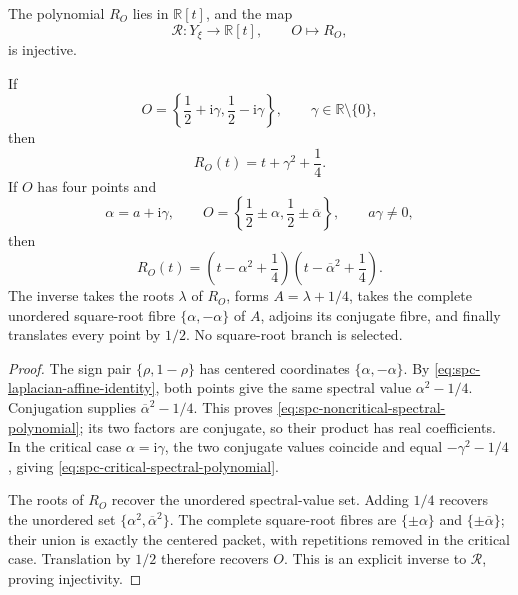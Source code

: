 \begin{theorem}
\label{thm:spc-spectral-packet-polynomial}
The polynomial \(R_O\) lies in \(\mathbb R[t]\), and the map
\begin{equation}
\label{eq:spc-spectral-polynomial-map}
 \mathcal R:Y_\xi\longrightarrow\mathbb R[t],
 \qquad O\longmapsto R_O,
\end{equation}
is injective.

If
\[
 O=\left\{\frac12+\mathrm i\gamma,
           \frac12-\mathrm i\gamma\right\},
 \qquad \gamma\in\mathbb R\setminus\{0\},
\]
then
\begin{equation}
\label{eq:spc-critical-spectral-polynomial}
 R_O(t)=t+\gamma^2+\frac14.
\end{equation}
If \(O\) has four points and
\[
 \alpha=a+\mathrm i\gamma,
 \qquad
 O=\left\{\frac12\pm\alpha,
           \frac12\pm\overline\alpha\right\},
 \qquad a\gamma\ne0,
\]
then
\begin{equation}
\label{eq:spc-noncritical-spectral-polynomial}
 R_O(t)
 =
 \left(t-\alpha^2+\frac14\right)
 \left(t-\overline{\alpha}^{2}+\frac14\right).
\end{equation}
The inverse takes the roots \(\lambda\) of \(R_O\), forms
\(A=\lambda+1/4\), takes the complete unordered square-root fibre
\(\{\alpha,-\alpha\}\) of \(A\), adjoins its conjugate fibre, and finally
translates every point by \(1/2\).  No square-root branch is selected.
\end{theorem}

\begin{proof}
The sign pair \(\{\rho,1-\rho\}\) has centered coordinates
\(\{\alpha,-\alpha\}\).  By
\eqref{eq:spc-laplacian-affine-identity}, both points give the same spectral
value \(\alpha^2-1/4\).  Conjugation supplies
\(\overline{\alpha}^{2}-1/4\).  This proves
\eqref{eq:spc-noncritical-spectral-polynomial}; its two factors are conjugate,
so their product has real coefficients.  In the critical case
\(\alpha=\mathrm i\gamma\), the two conjugate values coincide and equal
\(-\gamma^2-1/4\), giving \eqref{eq:spc-critical-spectral-polynomial}.

The roots of \(R_O\) recover the unordered spectral-value set.  Adding
\(1/4\) recovers the unordered set
\(\{\alpha^2,\overline{\alpha}^{2}\}\).  The complete square-root fibres are
\(\{\pm\alpha\}\) and \(\{\pm\overline\alpha\}\); their union is exactly
the centered packet, with repetitions removed in the critical case.
Translation by \(1/2\) therefore recovers \(O\).  This is an explicit inverse
to \(\mathcal R\), proving injectivity.
\end{proof}

